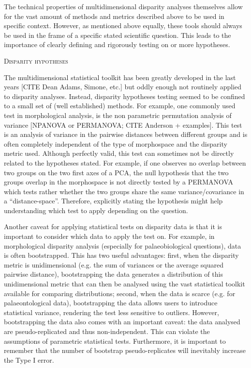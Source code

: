 \documentclass[12pt,letterpaper]{article}
\renewcommand{\section}[1]{%
\bigskip
\begin{center}
\begin{Large}
\normalfont\scshape #1
\medskip
\end{Large}
\end{center}}
\begin{document}
The technical properties of multidimensional disparity analyses themselves allow for the vast amount of methods and metrics described above to be used in specific context.
However, as mentioned above equally, these tools should always be used in the frame of a specific stated scientific question.
This leads to the importance of clearly defining and rigorously testing on or more hypotheses.

\section{Disparity hypotheses}
The multidimensional statistical toolkit has been greatly developed in the last years [CITE Dean Adams, Simone, etc.] but oddly enough not routinely applied to disparity analyses.
Instead, disparity hypotheses testing seemed to be confined to a small set of (well established) methods.
For example, one commonly used test in morphological analysis, is the non parametric permutation analysis of variance [NPANOVA or PERMANOVA; CITE Anderson + examples].
This test is an analysis of variance in the pairwise distances between different groups and is often completely independent of the type of morphospace and the disparity metric used.
Although perfectly valid, this test can sometimes not be directly related to the hypotheses stated.
For example, if one observes no overlap between two groups on the two first axes of a PCA, the null hypothesis that the two groups overlap in the morphospace is not directly tested by a PERMANOVA which tests rather whether the two groups share the same variance/covariance in a ``distance-space''.
Therefore, explicitly stating the hypothesis might help understanding which test to apply depending on the question.

Another caveat for applying statistical tests on disparity data is that it is important to consider which data to apply the test on.
For example, in morphological disparity analysis (especially for palaeobiological questions), data is often bootstrapped.
This has two useful advantages: first, when the disparity metric is unidimensional (e.g. the sum of variances or the average squared pairwise distance), bootstrapping the data generates a distribution of this unidimensional metric that can then be analysed using the vast statistical toolkit available for comparing distributions; second, when the data is scarce (e.g. for palaeontological data), bootstrapping the data allows users to introduce statistical variance, rendering the test less sensitive to outliers.
However, bootstrapping the data also comes with an important caveat: the data analysed are pseudo-replicated and thus non-independent.
This can violate the assumptions of parametric statistical tests.
Furthermore, it is important to remember that the number of bootstrap pseudo-replicates will inevitably increase the Type I error.
\end{document}
